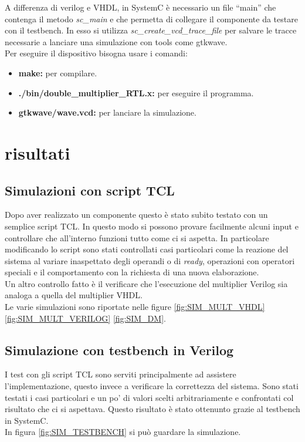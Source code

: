 \documentclass[]{IEEEtran}
\begin{document}
A differenza di verilog e VHDL, in SystemC è necessario un file ``main'' che contenga il metodo \textit{sc\_main} e che permetta di collegare il componente da testare con il testbench. In esso si utilizza \textit{sc\_create\_vcd\_trace\_file} per salvare le tracce necessarie a lanciare una simulazione con tools come gtkwave.
\\Per eseguire il dispositivo bisogna usare i comandi:
\begin{itemize}
    \item \textbf{make: } per compilare.
    \item \textbf{./bin/double\_multiplier\_RTL.x:} per eseguire il programma.
    \item \textbf{gtkwave/wave.vcd:} per lanciare la simulazione.
\end{itemize}



\section{risultati}

\subsection{Simulazioni con script TCL}
Dopo aver realizzato un componente questo è stato subito testato con un semplice script TCL. In questo modo si possono provare facilmente alcuni input e controllare che all'interno funzioni tutto come ci si aspetta. In particolare modificando lo script sono stati controllati casi particolari come la reazione del sistema al variare inaspettato degli operandi o di \textit{ready}, operazioni con operatori speciali e il comportamento con la richiesta di una nuova elaborazione.
\\Un altro controllo fatto è il verificare che l'esecuzione del multiplier Verilog sia analoga a quella del multiplier VHDL.
\\Le varie simulazioni sono riportate nelle figure \ref{fig:SIM_MULT_VHDL} \ref{fig:SIM_MULT_VERILOG} \ref{fig:SIM_DM}.


\subsection{Simulazione con testbench in Verilog}
I test con gli script TCL sono serviti principalmente ad assistere l'implementazione, questo invece a verificare la correttezza del sistema. Sono stati testati i casi particolari e un po' di valori scelti arbitrariamente e confrontati col risultato che ci si aspettava. Questo risultato è stato ottenunto grazie al testbench in SystemC.
\\In figura \ref{fig:SIM_TESTBENCH} si può guardare la simulazione.
\end{document}
